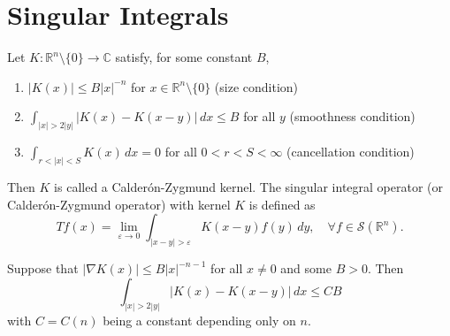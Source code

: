 \documentclass[12pt,openany]{book}
\begin{document}
\section{Singular Integrals}
\begin{definition}
    Let $K: \mathbb{R}^n \setminus \{0\} \rightarrow \mathbb{C}$ satisfy, for some constant $B$,
\begin{enumerate}
    \item $|K(x)| \leqslant B|x|^{-n}$ for $x \in \mathbb{R}^n \setminus \{0\}$ \quad (size condition)
    \item $\int_{|x|>2|y|}|K(x) - K(x-y)| \, dx \leq B$ for all $y$ \quad (smoothness condition)
    \item $\int_{r<|x|<S} K(x) \, dx = 0$ for all $0 < r < S < \infty$ \quad (cancellation condition)
\end{enumerate}
Then $K$ is called a Calder\'{o}n-Zygmund kernel.
The singular integral operator (or Calder\'{o}n-Zygmund operator) with kernel $K$ is defined as
\[
Tf(x) = \lim_{\varepsilon \rightarrow 0} \int_{|x-y|>\varepsilon} K(x-y) f(y) \, dy, \quad \forall f \in \mathcal{S}(\mathbb{R}^n).
\]
\end{definition}
\begin{lemma}
    Suppose that $|\nabla K(x)| \leq B|x|^{-n-1}$ for all $x \neq 0$ and some $B > 0$. Then
\[
\int_{|x|>2|y|}|K(x) - K(x-y)| \, dx \leq CB
\]
with $C = C(n)$ being a constant depending only on $n$.
\end{lemma}
\end{document}
